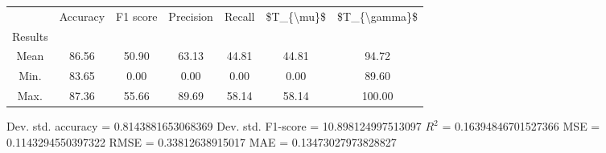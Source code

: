 \begin{tabular}{|c|c|c|c|c|c|c|}
\toprule
{} &  Accuracy &  F1 score &  Precision &  Recall &  \$T\_\{\textbackslash mu\}\$ &  \$T\_\{\textbackslash gamma\}\$ \\
Results &           &           &            &         &            &               \\
\hline
Mean    &     86.56 &     50.90 &      63.13 &   44.81 &      44.81 &         94.72 \\
Min.    &     83.65 &      0.00 &       0.00 &    0.00 &       0.00 &         89.60 \\
Max.    &     87.36 &     55.66 &      89.69 &   58.14 &      58.14 &        100.00 \\
\bottomrule
\end{tabular}

 Dev. std. accuracy = 0.8143881653068369
 Dev. std. F1-score = 10.898124997513097
 $R^2$ = 0.16394846701527366
 MSE = 0.1143294550397322
 RMSE = 0.33812638915017
 MAE = 0.13473027973828827